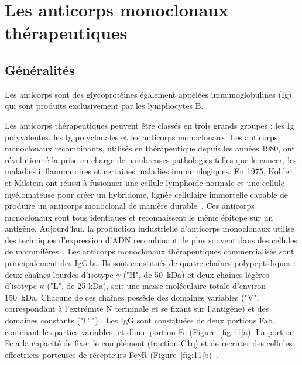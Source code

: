 \section{Les anticorps monoclonaux thérapeutiques}
\subsection{Généralités}
Les anticorps sont des glycoprotéines également appelées immunoglobulines (Ig) qui sont produits exclusivement par les lymphocytes B.

Les anticorps thérapeutiques peuvent être classés en trois grands groupes : les Ig polyvalentes, les Ig polyclonales et les anticorps monoclonaux. Les anticorps monoclonaux recombinants, utilisés en thérapeutique depuis les années 1980, ont révolutionné la prise en charge de nombreuses pathologies telles que le cancer, les maladies inflammatoires et certaines maladies immunologiques. En 1975, Kohler et Milstein ont réussi à fusionner une cellule lymphoïde normale et une cellule myélomateuse pour créer un hybridome, lignée cellulaire immortelle capable de produire un anticorps monoclonal de manière durable~\citep{REF13}. Ces anticorps monoclonaux sont tous identiques et reconnaissent le même épitope sur un antigène. Aujourd'hui, la production industrielle d'anticorps monoclonaux utilise des techniques d'expression d'ADN recombinant, le plus souvent dans des cellules de mammifères~\citep{REF14, REF15}. Les anticorps monoclonaux thérapeutiques commercialisés sont principalement des IgG1$\kappa$. Ils sont constitués de quatre chaînes polypeptidiques : deux chaînes lourdes d'isotype $\gamma$ ("H", de 50~kDa) et deux chaînes légères d'isotype $\kappa$ ("L", de 25 kDa), soit une masse moléculaire totale d'environ 150~kDa. Chacune de ces chaînes possède des domaines variables ("V", correspondant à l'extrémité N terminale et se fixant sur l'antigène) et des domaines constants ("C ") . Les IgG sont constituées de deux portions Fab, contenant les parties variables, et d'une portion Fc (Figure~\ref{fig:11}a). La portion Fc a la capacité de fixer le complément (fraction C1q) et de recruter des cellules effectrices porteuses de récepteurs Fc$\gamma$R (Figure~\ref{fig:11}b)~\citep{REF16}.

